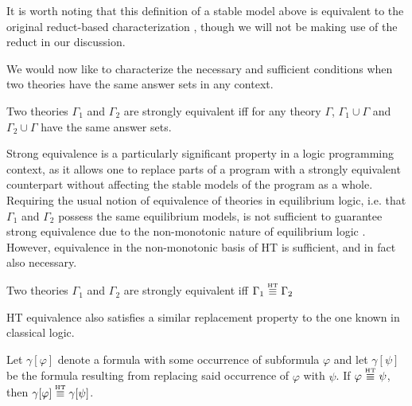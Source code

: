 It is worth noting that this definition of a stable model above is
equivalent to the original reduct-based characterization
\cite{lipeva01a}, though we will not be making use of the reduct in
our discussion. 

We would now like to characterize the necessary and sufficient
conditions when two theories have the same answer sets in any context.

\begin{definition}
  Two theories $\Gamma_1$ and $\Gamma_2$ are strongly equivalent iff for
  any theory $\Gamma$, $\Gamma_1 \cup \Gamma$ and
  $\Gamma_2 \cup \Gamma$ have the same answer sets.
\end{definition}

Strong equivalence is a particularly significant property in a logic
programming context, as it allows one to replace parts of a program
with a strongly equivalent counterpart without affecting the stable
models of the program as a whole. Requiring the usual notion of
equivalence of theories in equilibrium logic, i.e. that $\Gamma_1$ and
$\Gamma_2$ possess the same equilibrium models, is not sufficient to
guarantee strong equivalence due to the non-monotonic nature of
equilibrium logic \cite{lipeva01a}.  However, equivalence in the
non-monotonic basis of HT is sufficient, and in fact also necessary.

\begin{proposition}
  Two theories $\Gamma_1$ and $\Gamma_2$ are strongly equivalent
  iff $\Gamma_1 \stackrel{\normalfont\mbox{\tiny HT}}{\equiv} \Gamma_2$
\end{proposition}

HT equivalence also satisfies a similar replacement property
to the one known in classical logic.

\begin{proposition}
  Let $\gamma[\varphi]$ denote a formula with some occurrence of
  subformula $\varphi$ and let $\gamma[\psi]$ be the formula resulting
  from replacing said occurrence of $\varphi$ with $\psi$. If
  $\varphi \stackrel{\normalfont\mbox{\tiny HT}}{\equiv} \psi$, then $\gamma[\varphi] \stackrel{\normalfont\mbox{\tiny HT}}{\equiv} \gamma[\psi]$.
\end{proposition}